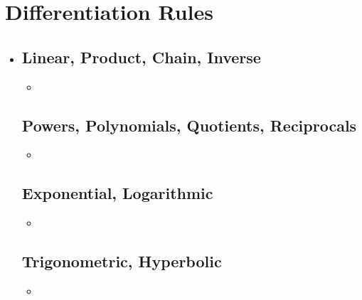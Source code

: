 \section{Differentiation Rules}
  \begin{itemize}
    \item 

  \subsection{Linear, Product, Chain, Inverse}
  \begin{itemize}
    \item 
  \end{itemize}
  
  \subsection{Powers, Polynomials, Quotients, Reciprocals}
  \begin{itemize}
    \item 
  \end{itemize}

  \subsection{Exponential, Logarithmic}
  \begin{itemize}
    \item 
  \end{itemize}

  \subsection{Trigonometric, Hyperbolic}
  \begin{itemize}
    \item 
  \end{itemize}

\end{itemize}


